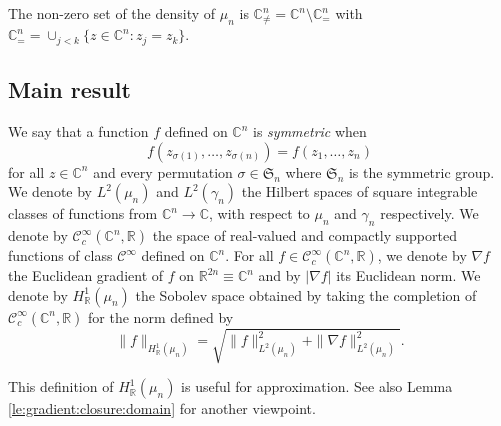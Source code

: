 \documentclass[11pt,reqno]{amsart}
\numberwithin{equation}{section}%
\numberwithin{figure}{section}%
\numberwithin{table}{section}
\theoremstyle{plain}
\theoremstyle{definition}
\begin{document}
The non-zero set of the density of $\mu_n$ is
$\mathbb{C}^n_{\neq}=\mathbb{C}^n\setminus\mathbb{C}^n_{=}$ with
$\mathbb{C}^n_{=}=\cup_{j<k}\{z\in\mathbb{C}^n:z_j=z_k\}$.

\subsection{Main result}

We say that a function $f$ defined on $\mathbb{C}^n$ is \emph{symmetric} when
\begin{equation}\label{eq:symmetric}
  f(z_{\sigma(1)},\ldots,z_{\sigma(n)})=f(z_1,\ldots,z_n)
\end{equation}
for all $z\in\mathbb{C}^n$ and every permutation $\sigma\in\mathfrak{S}_n$
where $\mathfrak{S}_n$ is the symmetric group. We denote by $L^2(\mu_n)$ and
$L^2(\gamma_n)$ the Hilbert spaces of square integrable classes of functions
from $\mathbb{C}^n\to\mathbb{C}$, with respect to $\mu_n$ and $\gamma_n$
respectively. We denote by $\mathcal{C}^\infty_c(\mathbb{C}^n,\mathbb{R})$ the
space of real-valued and compactly supported functions of class
$\mathcal{C}^\infty$ defined on $\mathbb{C}^n$. For all
$f\in\mathcal{C}^\infty_c(\mathbb{C}^n,\mathbb{R})$, we denote by $\nabla f$
the Euclidean gradient of $f$ on $\mathbb{R}^{2n}\equiv\mathbb{C}^n$ and by
$|\nabla f|$ its Euclidean norm. We denote by $H^1_{\mathbb{R}}(\mu_n)$ the
Sobolev space obtained by taking the completion of
$\mathcal{C}^\infty_c(\mathbb{C}^n,\mathbb{R})$ for the norm defined by
\begin{equation}\label{eq:graphnorm}
  \|f\|_{H^1_{\mathbb{R}}(\mu_n)}=\sqrt{\|f\|_{L^2(\mu_n)}^2+\|\nabla f\|_{L^2(\mu_n)}^2}.
\end{equation}


This definition of $H^1_{\mathbb{R}}(\mu_n)$ is useful for approximation. See
also Lemma \ref{le:gradient:closure:domain} for another viewpoint.

\end{document}
